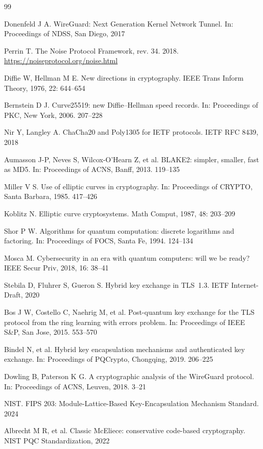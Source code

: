 \documentclass{SCIS2026}
\begin{document}
\begin{thebibliography}{99}

 Donenfeld J A. WireGuard: Next Generation Kernel Network Tunnel. In: Proceedings of NDSS, San Diego, 2017

 Perrin T. The Noise Protocol Framework, rev. 34. 2018. \url{https://noiseprotocol.org/noise.html}

 Diffie W, Hellman M E. New directions in cryptography. IEEE Trans Inform Theory, 1976, 22: 644--654

 Bernstein D J. Curve25519: new Diffie--Hellman speed records. In: Proceedings of PKC, New York, 2006. 207--228

 Nir Y, Langley A. ChaCha20 and Poly1305 for IETF protocols. IETF RFC 8439, 2018

 Aumasson J-P, Neves S, Wilcox-O'Hearn Z, et al. BLAKE2: simpler, smaller, fast as MD5. In: Proceedings of ACNS, Banff, 2013. 119--135

 Miller V S. Use of elliptic curves in cryptography. In: Proceedings of CRYPTO, Santa Barbara, 1985. 417--426

 Koblitz N. Elliptic curve cryptosystems. Math Comput, 1987, 48: 203--209

 Shor P W. Algorithms for quantum computation: discrete logarithms and factoring. In: Proceedings of FOCS, Santa Fe, 1994. 124--134

 Mosca M. Cybersecurity in an era with quantum computers: will we be ready? IEEE Secur Priv, 2018, 16: 38--41

 Stebila D, Fluhrer S, Gueron S. Hybrid key exchange in TLS~1.3. IETF Internet-Draft, 2020

 Bos J W, Costello C, Naehrig M, et al. Post-quantum key exchange for the TLS protocol from the ring learning with errors problem. In: Proceedings of IEEE S\&P, San Jose, 2015. 553--570

 Bindel N, et al. Hybrid key encapsulation mechanisms and authenticated key exchange. In: Proceedings of PQCrypto, Chongqing, 2019. 206--225

 Dowling B, Paterson K G. A cryptographic analysis of the WireGuard protocol. In: Proceedings of ACNS, Leuven, 2018. 3--21

 NIST. FIPS 203: Module-Lattice-Based Key-Encapsulation Mechanism Standard. 2024

 Albrecht M R, et al. Classic McEliece: conservative code-based cryptography. NIST PQC Standardization, 2022


\end{thebibliography}
\end{document}
